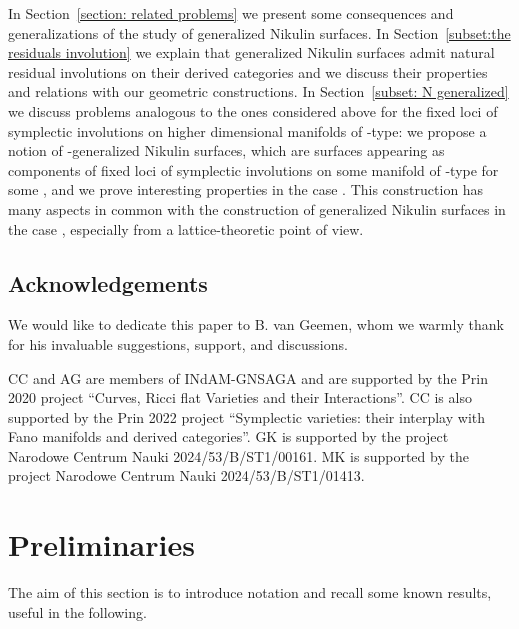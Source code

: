 \documentclass{amsart}
\makeatletter
\theoremstyle{definition}
\numberwithin{equation}{section}
\numberwithin{equation}{section} \theoremstyle{definition}
\newcounter{mathrecordid}
\newcommand{\mathboxbegin}[1]{%
  \stepcounter{mathrecordid}%
  \immediate\write\mathrecords{\themathrecordid,#1}%
  \special{pdf:bann << /Type /Annot /Subtype /Link /Border [0 0 0]
    /MathBoxID \themathrecordid /F 2
    /A << /S /URI /URI (urn:mathbox:\themathrecordid) >> >>}}
\newcommand{\mathboxinlineplain}[1]{$#1$}
\newcommand{\mathboxinline}[1]{%
  $\mathboxbegin{inline}#1\special{pdf:eann}$}
\newcommand{\recordmath}{%
  \ifmeasuring@\expandafter\mathboxinlineplain
  \else\expandafter\mathboxinline\fi}
\makeatother
\begin{document}
In Section~\ref{section: related problems} we present some consequences and
generalizations of the study of generalized Nikulin surfaces.
In Section~\ref{subset:the residuals involution} we explain that generalized Nikulin
surfaces admit natural residual involutions \cite{El} on their derived categories and
we discuss their properties and relations with our geometric constructions.
In Section~\ref{subset: N generalized} we discuss problems analogous to the ones
considered above for the fixed loci of symplectic involutions on higher dimensional
 manifolds of \recordmath{K3^{[n]}}-type: we propose a notion of \recordmath{n}-generalized Nikulin surfaces,
which are surfaces appearing as components of fixed loci of symplectic involutions on
some  manifold of \recordmath{K3^{[n]}}-type for some \recordmath{n\geq 3}, and we prove interesting properties in the case \recordmath{n=3}. This construction has many aspects in common with the construction of generalized Nikulin surfaces in the case \recordmath{n=2}, especially from a lattice-theoretic point of view.


\subsection*{Acknowledgements}

We would like to dedicate this paper to B. van Geemen, whom we warmly thank for his invaluable suggestions, support, and discussions.

CC and AG are members of INdAM-GNSAGA and are supported by the Prin 2020 project ``Curves, Ricci flat Varieties and their Interactions''. CC is also supported by the Prin 2022 project ``Symplectic varieties: their interplay with Fano manifolds and derived categories''.
GK is supported by the project Narodowe Centrum Nauki 2024/53/B/ST1/00161.
MK is supported by the project Narodowe Centrum Nauki 2024/53/B/ST1/01413.


\section{Preliminaries}\label{preliminaries}\label{sec: preliminaries}
The aim of this section is to introduce notation and recall some known results, useful in the following.
\end{document}
